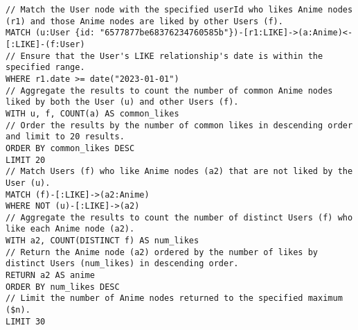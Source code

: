 \begin{mdframed}[style=customstyle2]
\begin{lstlisting}[language=Cypher, backgroundcolor=\color{white}]
// Match the User node with the specified userId who likes Anime nodes (r1) and those Anime nodes are liked by other Users (f).
MATCH (u:User {id: "6577877be68376234760585b"})-[r1:LIKE]->(a:Anime)<-[:LIKE]-(f:User)
// Ensure that the User's LIKE relationship's date is within the specified range.
WHERE r1.date >= date("2023-01-01")
// Aggregate the results to count the number of common Anime nodes liked by both the User (u) and other Users (f).
WITH u, f, COUNT(a) AS common_likes
// Order the results by the number of common likes in descending order and limit to 20 results.
ORDER BY common_likes DESC
LIMIT 20
// Match Users (f) who like Anime nodes (a2) that are not liked by the User (u).
MATCH (f)-[:LIKE]->(a2:Anime)
WHERE NOT (u)-[:LIKE]->(a2)
// Aggregate the results to count the number of distinct Users (f) who like each Anime node (a2).
WITH a2, COUNT(DISTINCT f) AS num_likes
// Return the Anime node (a2) ordered by the number of likes by distinct Users (num_likes) in descending order.
RETURN a2 AS anime
ORDER BY num_likes DESC
// Limit the number of Anime nodes returned to the specified maximum ($n).
LIMIT 30\end{lstlisting}
\end{mdframed}